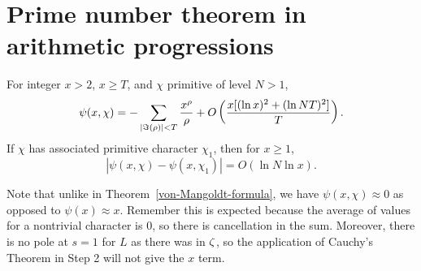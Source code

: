 \section{Prime number theorem in arithmetic progressions}
\begin{thm}
For integer $x>2$, $x\ge T$, and $\chi$ primitive of level $N>1$,
\[
\psi(x,\chi)= -\sum_{|\Im(\rho)|<T}\frac{x^{\rho}}{\rho}
+O\left( {
\frac{x[(\ln x)^2+(\ln NT)^2]}{T}} \right).
\]
If $\chi$ has associated primitive character $\chi_1$, then for $x\ge 1$,
\[
|\psi(x,\chi)-\psi(x,\chi_1)|=O(\ln N\ln x).
\]
\end{thm}
Note that unlike in Theorem~\ref{von-Mangoldt-formula}, we have $\psi(x,\chi)\approx 0$ as opposed to $\psi(x)\approx x$. Remember this is expected because the average of values for a nontrivial character is 0, so there is cancellation in the sum. Moreover, there is no pole at $s=1$ for $L$ as there was in $\zeta$, so the application of Cauchy's Theorem in Step 2 will not give the $x$ term.
